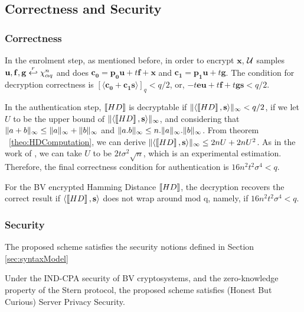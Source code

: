\subsection{Correctness and Security}
\label{sec:protocol1CorrectnessSecurity}

\subsubsection{Correctness}
\label{sec:correctness}
In the enrolment step, as mentioned before, in order to encrypt $\mathbf{x}$,
$\mathcal{U}$ samples $\mathbf{u,f,g} \stackrel{r}{\hookleftarrow} \chi_{\alpha q}^n$ and does
$\mathbf{c_0} = \mathbf{p_0u} + t\mathbf{f} + \mathbf{x}$ and
$\mathbf{c_1} = \mathbf{p_1u} + t\mathbf{g}$. The condition for decryption
correctness is $[\langle \mathbf{c_0 + c_1s} \rangle]_q < q/2$, or,
$-t\mathbf{eu} + t\mathbf{f} + t\mathbf{gs} < q/2$.

In the authentication step, \(\left\llbracket HD\right\rrbracket\) is decryptable if
\(\Vert \langle \left\llbracket HD\right\rrbracket, \mathbf{s} \rangle \Vert_{\infty} < q/2\), if we let \(U\) to be
the upper bound of \(\Vert \langle \left\llbracket HD\right\rrbracket, \mathbf{s} \rangle \Vert_{\infty}\), and
considering that \(\Vert a + b \Vert_{\infty} \leq \Vert a \Vert_{\infty} + \Vert b \Vert_{\infty}\) and
\(\Vert a.b \Vert_{\infty} \leq n.\Vert a \Vert_{\infty}.\Vert b \Vert_{\infty}\). From theorem
~\ref{theo:HDComputation}, we can derive
\(\Vert \langle \left\llbracket HD\right\rrbracket,\mathbf{s} \rangle \Vert_{\infty} \leq 2nU + 2nU^{2}\). As in the
work of \cite{naehrig2011can}, we can take \(U\) to be
\(2t \sigma^{2} \sqrt{n}\), which is an experimental estimation. Therefore, the
final correctness condition for authentication is
\( 16n^{2}t^{2}\sigma^{4} < q\).
\begin{lemma}
  \label{le:hdcorrectness}
 For the BV encrypted Hamming Distance \(\left\llbracket HD\right\rrbracket\), the decryption recovers the correct result if \(\langle \left\llbracket HD\right\rrbracket,
 \mathbf{s} \rangle\) does not wrap around mod q, namely, if \(16n^{2}t^{2}\sigma^{4} < q\).
\end{lemma}

\subsubsection{Security}
\label{sec:securityPro1}
The proposed scheme satisfies the security notions defined in Section \ref{sec:syntaxModel}
\begin{theorem}
  \label{theo:serverPro1}
  Under the IND-CPA security of BV cryptosystems, and the zero-knowledge property of the Stern protocol, the proposed
  scheme satisfies (Honest But Curious) Server Privacy Security.
\end{theorem}


